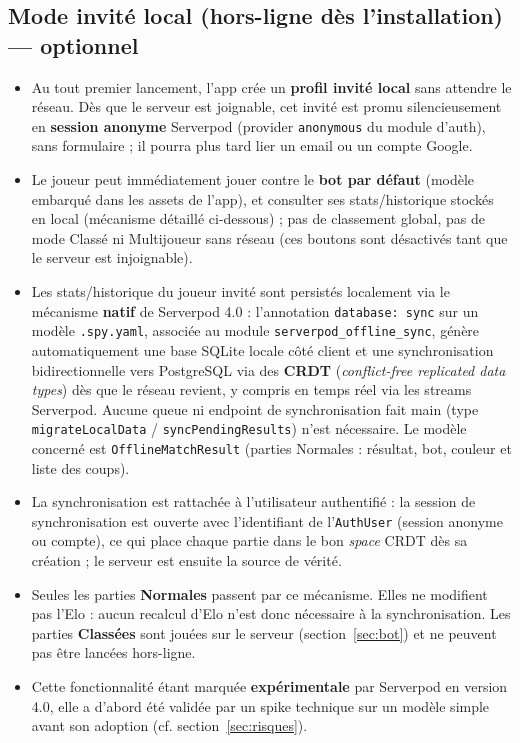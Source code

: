 \documentclass[a4paper,11pt]{article}
\begin{document}
\subsection{Mode invité local (hors-ligne dès l'installation) --- optionnel}
\label{sec:invite}
\begin{itemize}[leftmargin=1.5em]
  \item Au tout premier lancement, l'app crée un \textbf{profil invité local} sans
        attendre le réseau. Dès que le serveur est joignable, cet invité est
        promu silencieusement en \textbf{session anonyme} Serverpod (provider
        \texttt{anonymous} du module d'auth), sans formulaire ; il pourra plus tard
        lier un email ou un compte Google.
  \item Le joueur peut immédiatement jouer contre le \textbf{bot par défaut}
        (modèle embarqué dans les assets de l'app), et consulter ses stats/historique
        stockés en local (mécanisme détaillé ci-dessous) ; pas de classement global,
        pas de mode Classé ni Multijoueur sans réseau (ces boutons sont désactivés
        tant que le serveur est injoignable).
  \item Les stats/historique du joueur invité sont persistés localement via le
        mécanisme \textbf{natif} de Serverpod 4.0 : l'annotation \texttt{database:
        sync} sur un modèle \texttt{.spy.yaml}, associée au module
        \texttt{serverpod\_offline\_sync}, génère automatiquement une base SQLite
        locale côté client et une synchronisation bidirectionnelle vers PostgreSQL
        via des \textbf{CRDT} (\textit{conflict-free replicated data types}) dès que
        le réseau revient, y compris en temps réel via les streams Serverpod. Aucune
        queue ni endpoint de synchronisation fait main (type \texttt{migrateLocalData}
        / \texttt{syncPendingResults}) n'est nécessaire. Le modèle concerné est
        \texttt{OfflineMatchResult} (parties Normales : résultat, bot, couleur et
        liste des coups).
  \item La synchronisation est rattachée à l'utilisateur authentifié : la session
        de synchronisation est ouverte avec l'identifiant de l'\texttt{AuthUser}
        (session anonyme ou compte), ce qui place chaque partie dans le bon
        \textit{space} CRDT dès sa création ; le serveur est ensuite la source de
        vérité.
  \item Seules les parties \textbf{Normales} passent par ce mécanisme. Elles ne
        modifient pas l'Elo : aucun recalcul d'Elo n'est donc nécessaire à la
        synchronisation. Les parties \textbf{Classées} sont jouées sur le serveur
        (section~\ref{sec:bot}) et ne peuvent pas être lancées hors-ligne.
  \item Cette fonctionnalité étant marquée \textbf{expérimentale} par Serverpod en
        version 4.0, elle a d'abord été validée par un spike technique sur un
        modèle simple avant son adoption (cf. section~\ref{sec:risques}).
\end{itemize}
\end{document}

